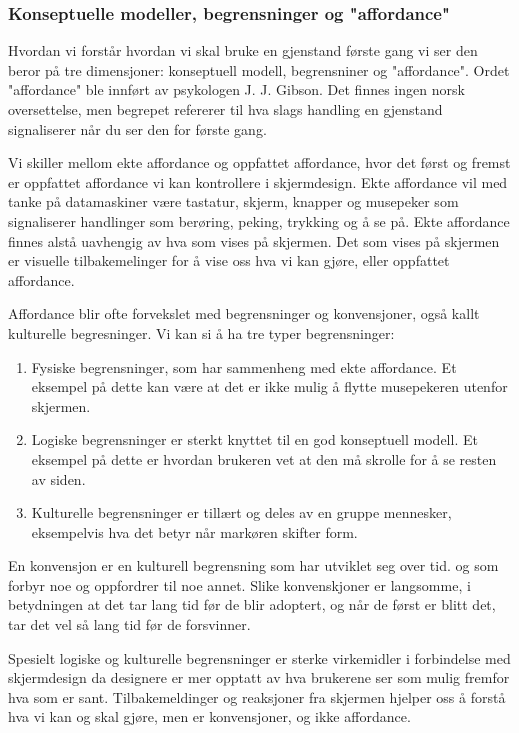 \subsubsection{Konseptuelle modeller, begrensninger og "affordance"}

Hvordan vi forstår hvordan vi skal bruke en gjenstand første gang vi ser den beror på tre dimensjoner: konseptuell modell, begrensniner og "affordance". Ordet "affordance" ble innført av psykologen J. J. Gibson. Det finnes ingen norsk oversettelse, men begrepet refererer til hva slags handling en gjenstand signaliserer når du ser den for første gang.\cite{Norman99}

\noindent
Vi skiller mellom ekte affordance og oppfattet affordance, hvor det først og fremst er oppfattet affordance vi kan kontrollere i skjermdesign. Ekte affordance vil med tanke på datamaskiner være tastatur, skjerm, knapper og musepeker som signaliserer handlinger som berøring, peking, trykking og å se på. Ekte affordance finnes alstå uavhengig av hva som vises på skjermen. Det som vises på skjermen er visuelle tilbakemelinger for å vise oss hva vi kan gjøre, eller oppfattet affordance.\cite{Norman99}

\noindent
Affordance blir ofte forvekslet med begrensninger og konvensjoner, også kallt kulturelle begresninger. Vi kan si å ha tre typer begrensninger:
\begin{enumerate}
\item Fysiske begrensninger, som har sammenheng med ekte affordance. Et eksempel på dette kan være at det er ikke mulig å flytte musepekeren utenfor skjermen. 
\item Logiske begrensninger er sterkt knyttet til en god konseptuell modell. Et eksempel på dette er hvordan brukeren vet at den må skrolle for å se resten av siden.
\item Kulturelle begrensninger er tillært og deles av en gruppe mennesker, eksempelvis hva det betyr når markøren skifter form.
\end{enumerate}
En konvensjon er en kulturell begrensning som har utviklet seg over tid. og som forbyr noe og oppfordrer til noe annet. Slike konvenskjoner er langsomme, i betydningen at det tar lang tid før de blir adoptert, og når de først er blitt det, tar det vel så lang tid før de forsvinner. \cite{Norman99}

\noindent
Spesielt logiske og kulturelle begrensninger er sterke virkemidler i forbindelse med skjermdesign da designere er mer opptatt av hva brukerene ser som mulig fremfor hva som er sant. Tilbakemeldinger og reaksjoner fra skjermen hjelper oss å forstå hva vi kan og skal gjøre, men er konvensjoner, og ikke affordance.\cite{Norman99}
